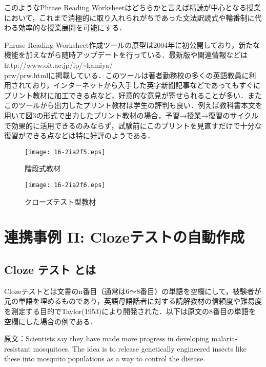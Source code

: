 \documentclass[japanese]{jnlp_1.4}
\begin{document}
このようなPhrase Reading Worksheetはどちらかと言えば精読が中心となる授業において，これまで消極的に取り入れられがちであった文法訳読式や輪番制に代わる効率的な授業展開を可能にする．

Phrase Reading Worksheet作成ツールの原型は2004年に初公開しており，新たな機能を加えながら随時アップデートを行っている．最新版や関連情報などは http://www.oit.ac.jp/ip/\textasciitilde kamiya/\\prw/prw.htmlに掲載している．このツールは著者勤務校の多くの英語教員に利用されており，インターネットから入手した英字新聞記事などであってもすぐにプリント教材に加工できる点など，好意的な意見が寄せられることが多い．またこのツールから出力したプリント教材は学生の評判も良い．例えば教科書本文を用いて図3の形式で出力したプリント教材の場合，予習→授業→復習のサイクルで効果的に活用できるのみならず，試験前にこのプリントを見直すだけで十分な復習ができる点などは特に好評のようである．

\begin{figure}[t]
 \begin{minipage}{0.45\textwidth}
  \begin{center}
    \texttt{[image: 16-2ia2f5.eps]}
  \end{center}
  \caption{階段式教材}
 \end{minipage}
\hfill
 \begin{minipage}{0.45\textwidth}
   \begin{center}
     \texttt{[image: 16-2ia2f6.eps]}
   \end{center}
   \caption{クローズテスト型教材}
 \end{minipage}
\end{figure}



\section{連携事例 II: Clozeテストの自動作成}

\subsection{Cloze テスト とは}

Clozeテストとは文書のn番目（通常は6〜8番目）の単語を空欄にして，被験者が元の単語を埋めるものであり，英語母語話者に対する読解教材の信頼度や難易度を測定する目的でTaylor(1953)により開発された．以下は原文の8番目の単語を空欄にした場合の例である．

原文：Scientists say they have made more progress in developing malaria-resistant mosquitoes. The idea is to release genetically engineered insects like these into mosquito populations as a way to control the disease.
\end{document}
